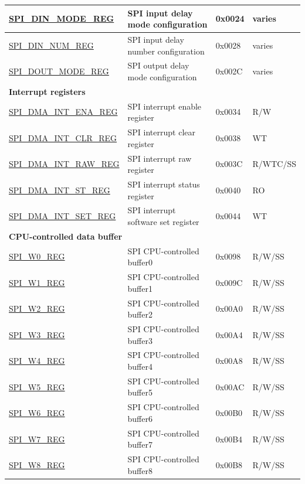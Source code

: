 \begin{longtable}{ | p{6cm} | p{6.9cm} | p{1.3cm} | p{1.5cm} | }
\hyperref[regdesc:SPIDINMODEREG]{SPI\_DIN\_MODE\_REG} & SPI input delay mode configuration & 0x0024 & varies \\ \hline
\hyperref[regdesc:SPIDINNUMREG]{SPI\_DIN\_NUM\_REG} & SPI input delay number configuration & 0x0028 & varies \\ \hline
\hyperref[regdesc:SPIDOUTMODEREG]{SPI\_DOUT\_MODE\_REG} & SPI output delay mode configuration & 0x002C & varies \\ \hline
\multicolumn{4}{|l|}{\textbf{Interrupt registers}} \\ \hline
\hyperref[regdesc:SPIDMAINTENAREG]{SPI\_DMA\_INT\_ENA\_REG} & SPI interrupt enable register & 0x0034 & R/W \\ \hline
\hyperref[regdesc:SPIDMAINTCLRREG]{SPI\_DMA\_INT\_CLR\_REG} & SPI interrupt clear register & 0x0038 & WT \\ \hline
\hyperref[regdesc:SPIDMAINTRAWREG]{SPI\_DMA\_INT\_RAW\_REG} & SPI interrupt raw register & 0x003C & R/WTC/SS \\ \hline
\hyperref[regdesc:SPIDMAINTSTREG]{SPI\_DMA\_INT\_ST\_REG} & SPI interrupt status register & 0x0040 & RO \\ \hline
\hyperref[regdesc:SPIDMAINTSETREG]{SPI\_DMA\_INT\_SET\_REG} & SPI interrupt software set register & 0x0044 & WT \\ \hline
\multicolumn{4}{|l|}{\textbf{CPU-controlled data buffer}} \\ \hline
\hyperref[regdesc:SPIW0REG]{SPI\_W0\_REG} & SPI CPU-controlled buffer0 & 0x0098 & R/W/SS \\ \hline
\hyperref[regdesc:SPIW0REG]{SPI\_W1\_REG} & SPI CPU-controlled buffer1 & 0x009C & R/W/SS \\ \hline
\hyperref[regdesc:SPIW0REG]{SPI\_W2\_REG} & SPI CPU-controlled buffer2 & 0x00A0 & R/W/SS \\ \hline
\hyperref[regdesc:SPIW0REG]{SPI\_W3\_REG} & SPI CPU-controlled buffer3 & 0x00A4 & R/W/SS \\ \hline
\hyperref[regdesc:SPIW0REG]{SPI\_W4\_REG} & SPI CPU-controlled buffer4 & 0x00A8 & R/W/SS \\ \hline
\hyperref[regdesc:SPIW0REG]{SPI\_W5\_REG} & SPI CPU-controlled buffer5 & 0x00AC & R/W/SS \\ \hline
\hyperref[regdesc:SPIW0REG]{SPI\_W6\_REG} & SPI CPU-controlled buffer6 & 0x00B0 & R/W/SS \\ \hline
\hyperref[regdesc:SPIW0REG]{SPI\_W7\_REG} & SPI CPU-controlled buffer7 & 0x00B4 & R/W/SS \\ \hline
\hyperref[regdesc:SPIW0REG]{SPI\_W8\_REG} & SPI CPU-controlled buffer8 & 0x00B8 & R/W/SS \\ \hline

\end{longtable}
